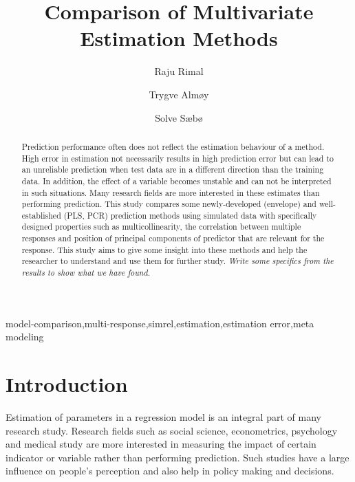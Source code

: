 \documentclass[12pt,3p,authoryear]{elsarticle}
\begin{document}
\begin{frontmatter}

  \title{Comparison of Multivariate Estimation Methods}
  
    \author[KBM]{Raju Rimal}
    \author[KBM]{Trygve Almøy}
  
    \author[NMBU]{Solve Sæbø}
  
      \address[KBM]{Faculty of Chemistry and Bioinformatics, Norwegian University of Life
Sciences, Ås, Norway}
    \address[NMBU]{Prorector, Norwegian University of Life Sciences, Ås, Norway}
  
  \begin{abstract}
  Prediction performance often does not reflect the estimation behaviour
  of a method. High error in estimation not necessarily results in high
  prediction error but can lead to an unreliable prediction when test data
  are in a different direction than the training data. In addition, the
  effect of a variable becomes unstable and can not be interpreted in such
  situations. Many research fields are more interested in these estimates
  than performing prediction. This study compares some newly-developed
  (envelope) and well-established (PLS, PCR) prediction methods using
  simulated data with specifically designed properties such as
  multicollinearity, the correlation between multiple responses and
  position of principal components of predictor that are relevant for the
  response. This study aims to give some insight into these methods and
  help the researcher to understand and use them for further study.
  \emph{Write some specifics from the results to show what we have found.}
  \end{abstract}
   \begin{keyword} model-comparison,multi-response,simrel,estimation,estimation error,meta modeling\end{keyword}

\end{frontmatter}

\section{Introduction}\label{introduction}

Estimation of parameters in a regression model is an integral part of
many research study. Research fields such as social science,
econometrics, psychology and medical study are more interested in
measuring the impact of certain indicator or variable rather than
performing prediction. Such studies have a large influence on people's
perception and also help in policy making and decisions.
\end{document}
